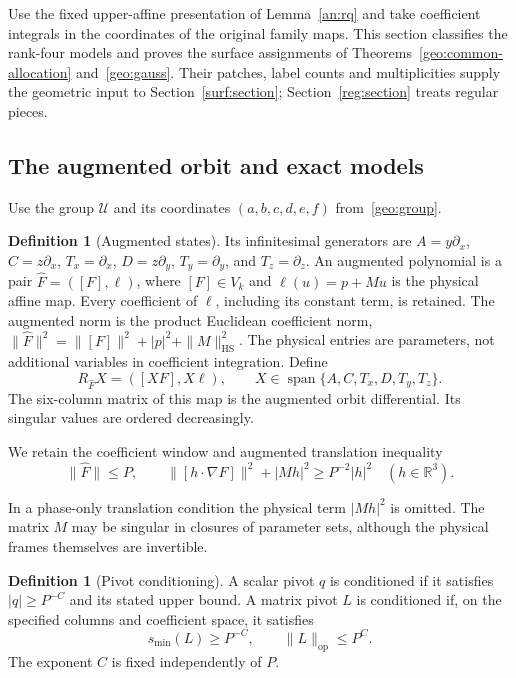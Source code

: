 \documentclass[11pt]{amsart}
\theoremstyle{definition}
\newtheorem{definition}{Definition}[section]
\newtheorem*{definition*}{Definition}
\theoremstyle{remark}
\numberwithin{equation}{section}
\begin{document}
Use the fixed upper-affine presentation of Lemma~\ref{an:rq} and take coefficient integrals in the coordinates of the original family maps. This section classifies the rank-four models and proves the surface assignments of Theorems~\ref{geo:common-allocation} and~\ref{geo:gauss}. Their patches, label counts and multiplicities supply the geometric input to Section~\ref{surf:section}; Section~\ref{reg:section} treats regular pieces.

\subsection{The augmented orbit and exact models}\label{geo:augmented-models}\label{geo:orbit-subsection}

Use the group $\mathcal U$ and its coordinates $(a,b,c,d,e,f)$ from~\eqref{geo:group}.
\begin{definition}[Augmented states]\label{def:augmented-state}
Its infinitesimal generators are $A=y\partial_x$, $C=z\partial_x$, $T_x=\partial_x$, $D=z\partial_y$, $T_y=\partial_y$, and $T_z=\partial_z$. An augmented polynomial is a pair $\widehat F=([F],\ell)$, where $[F]\in V_k$ and $\ell(u)=p+Mu$ is the physical affine map. Every coefficient of $\ell$, including its constant term, is retained. The augmented norm is the product Euclidean coefficient norm, $\|\widehat F\|^2=\|[F]\|^2+|p|^2+\|M\|_{\mathrm{HS}}^2$. The physical entries are parameters, not additional variables in coefficient integration. Define
\[
R_{\widehat F}X=([XF],X\ell),\qquad X\in\operatorname{span}\{A,C,T_x,D,T_y,T_z\}.
\]
The six-column matrix of this map is the augmented orbit differential. Its singular values are ordered decreasingly.

We retain the coefficient window and augmented translation inequality
\begin{equation}\label{geo:translation-stop}
\|\widehat F\|\le P,\qquad \|[h\cdot\nabla F]\|^2+|Mh|^2\ge P^{-2}|h|^2\quad(h\in\mathbb R^3).
\end{equation}

In a phase-only translation condition the physical term $|Mh|^2$ is omitted. The matrix $M$ may be singular in closures of parameter sets, although the physical frames themselves are invertible.
\end{definition}
\begin{definition*}[Pivot conditioning]
A scalar pivot $q$ is conditioned if it satisfies $|q|\ge P^{-C}$ and its stated upper bound. A matrix pivot $L$ is conditioned if, on the specified columns and coefficient space, it satisfies
\[
s_{\min}(L)\ge P^{-C},\qquad \|L\|_{\mathrm{op}}\le P^C.
\]
The exponent $C$ is fixed independently of $P$.
\end{definition*}
\end{document}
